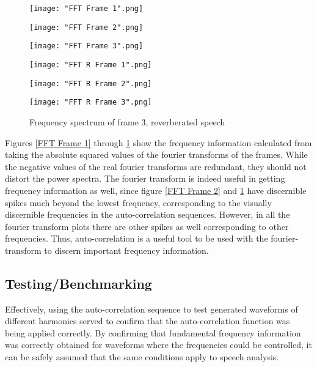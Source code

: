 \documentclass[12pt]{article}
\begin{document}
\begin{figure}[H]
	\texttt{[image: "FFT Frame 1".png]}
	\caption{Frequency spectrum of frame 1, dry speech}\label{FFT Frame 1}
	\endminipage\hfill
	\texttt{[image: "FFT Frame 2".png]}
	\caption{Frequency spectrum of frame 2, dry speech}\label{FFT Frame 2}
	\endminipage\hfill
	\texttt{[image: "FFT Frame 3".png]}
	\caption{Frequency spectrum of frame 3, dry speech}\label{FFT Frame 3}
	\endminipage\hfill
	\texttt{[image: "FFT R Frame 1".png]}
	\caption{Frequency spectrum of frame 1, reverberated speech}\label{FFT R Frame 1}
	\endminipage\hfill
	\texttt{[image: "FFT R Frame 2".png]}
	\caption{Frequency spectrum of frame 2, reverberated speech}\label{FFT R Frame 2}
	\endminipage\hfill
	\texttt{[image: "FFT R Frame 3".png]}
	\caption{Frequency spectrum of frame 3, reverberated speech}\label{FFT R Frame 3}
	\endminipage\hfill
\end{figure}

Figures \ref{FFT Frame 1} through \ref{FFT R Frame 3} show the frequency information calculated from taking the absolute squared values of the fourier transforms of the frames. While the negative values of the real fourier transforms are redundant, they should not distort the power spectra. The fourier transform is indeed useful in getting frequency information as well, since figure \ref{FFT Frame 2} and \ref{FFT R Frame 3} have discernible spikes much beyond the lowest frequency, corresponding to the visually discernible frequencies in the auto-correlation sequences. However, in all the fourier transform plots there are other spikes as well corresponding to other frequencies. Thus, auto-correlation is a useful tool to be used with the fourier-transform to discern important frequency information.

\subsection{Testing/Benchmarking}

Effectively, using the auto-correlation sequence to test generated waveforms of different harmonics served to confirm that the auto-correlation function was being applied correctly. By confirming that fundamental frequency information was correctly obtained for waveforms where the frequencies could be controlled, it can be safely assumed that the same conditions apply to speech analysis.\newline
\end{document}
